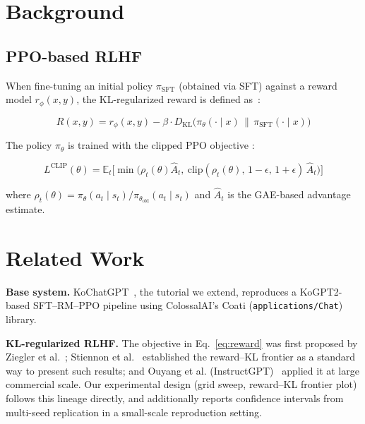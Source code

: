 \documentclass[conference]{IEEEtran}
\begin{document}
\section{Background}

\subsection{PPO-based RLHF}

When fine-tuning an initial policy $\pi_{\text{SFT}}$ (obtained via
SFT) against a reward model $r_\phi(x,y)$, the KL-regularized reward
is defined as~\cite{ziegler2019finetuning, ouyang2022instructgpt}:

\begin{equation}
R(x, y) = r_\phi(x, y) - \beta \cdot D_{\mathrm{KL}}\big(\pi_\theta(\cdot \mid x)
\,\|\, \pi_{\text{SFT}}(\cdot \mid x)\big)
\label{eq:reward}
\end{equation}

The policy $\pi_\theta$ is trained with the clipped PPO objective
\cite{schulman2017ppo}:

\begin{equation}
L^{\mathrm{CLIP}}(\theta) = \mathbb{E}_t\Big[\min\big(\rho_t(\theta)
\hat{A}_t,\ \mathrm{clip}(\rho_t(\theta),\, 1-\epsilon,\, 1+\epsilon)\,
\hat{A}_t\big)\Big]
\label{eq:ppo}
\end{equation}

where $\rho_t(\theta) = \pi_\theta(a_t \mid s_t) / \pi_{\theta_{\text{old}}}(a_t
\mid s_t)$ and $\hat{A}_t$ is the GAE-based advantage estimate.

\section{Related Work}

\textbf{Base system.} KoChatGPT~\cite{kochatgpt2023}, the tutorial we
extend, reproduces a KoGPT2-based SFT--RM--PPO pipeline using
ColossalAI's Coati (\texttt{applications/Chat})~\cite{colossalchat2023}
library.

\textbf{KL-regularized RLHF.} The objective in
Eq.~\eqref{eq:reward} was first proposed by Ziegler et
al.~\cite{ziegler2019finetuning}; Stiennon et
al.~\cite{stiennon2020learning} established the reward--KL frontier as
a standard way to present such results; and Ouyang et al.
(InstructGPT)~\cite{ouyang2022instructgpt} applied it at large
commercial scale. Our experimental design (grid sweep, reward--KL
frontier plot) follows this lineage directly, and additionally reports
confidence intervals from multi-seed replication in a small-scale
reproduction setting.
\end{document}

